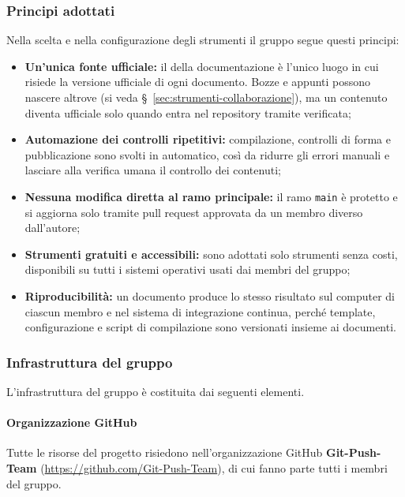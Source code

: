 \documentclass[documento]{gpt}
\begin{document}
	\subsubsection{Principi adottati}
	Nella scelta e nella configurazione degli strumenti il gruppo segue questi
	principi:
	\begin{itemize}
		\item \textbf{Un'unica fonte ufficiale:} il  della
		documentazione è l'unico luogo in cui risiede la versione ufficiale di
		ogni documento. Bozze e appunti possono nascere altrove (si veda
		\S~\ref{sec:strumenti-collaborazione}), ma un contenuto diventa
		ufficiale solo quando entra nel repository tramite 
		verificata;
		\item \textbf{Automazione dei controlli ripetitivi:} compilazione,
		controlli di forma e pubblicazione sono svolti in automatico, così
		da ridurre gli errori manuali e lasciare alla verifica umana il
		controllo dei contenuti;
		\item \textbf{Nessuna modifica diretta al ramo principale:} il ramo
		\texttt{main} è protetto e si aggiorna solo tramite pull request
		approvata da un membro diverso dall'autore;
		\item \textbf{Strumenti gratuiti e accessibili:} sono adottati solo
		strumenti senza costi, disponibili su tutti i sistemi operativi usati
		dai membri del gruppo;
		\item \textbf{Riproducibilità:} un documento produce lo stesso risultato
		sul computer di ciascun membro e nel sistema di integrazione
		continua, perché template, configurazione e script di compilazione
		sono versionati insieme ai documenti.
	\end{itemize}
	
	\subsubsection{Infrastruttura del gruppo}
	L'infrastruttura del gruppo è costituita dai seguenti elementi.
	
	\paragraph{Organizzazione GitHub}
	Tutte le risorse del progetto risiedono nell'organizzazione GitHub
	\textbf{Git-Push-Team} (\url{https://github.com/Git-Push-Team}), di cui fanno
	parte tutti i membri del gruppo.
	
\end{document}
